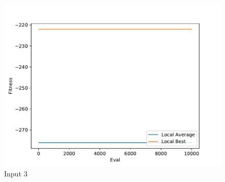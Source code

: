 \documentclass{standalone}
\begin{document}
\begin{figure}[!htb]
	\caption{Input 3}
	\label{fig:graph_3010}
	\includegraphics[width=\textwidth]{../graphs/graphs/3010.pdf}
\end{figure}
\end{document}
